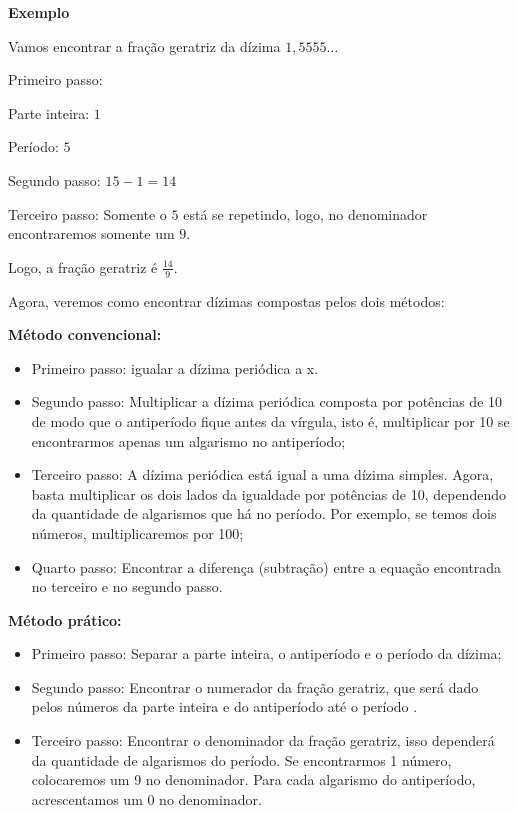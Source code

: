 \textbf{Exemplo}

Vamos encontrar a fração geratriz da dízima $1,5555\ldots{}$

Primeiro passo:

Parte inteira: $1$

Período: $5$

Segundo passo: $15 - 1 = 14$

Terceiro passo: Somente o $5$ está se repetindo, logo, no denominador
encontraremos somente um $9$.

Logo, a fração geratriz é $\frac{14}{9}$.

Agora, veremos como encontrar dízimas compostas pelos dois métodos:

\textbf{Método convencional:}

\begin{itemize}
\item
  Primeiro passo: igualar a dízima periódica a x.
\item
  Segundo passo: Multiplicar a dízima periódica composta por potências
  de 10 de modo que o antiperíodo fique antes da vírgula, isto é,
  multiplicar por 10 se encontrarmos apenas um algarismo no antiperíodo;
\item
  Terceiro passo: A dízima periódica está igual a uma dízima simples.
  Agora, basta multiplicar os dois lados da igualdade por potências de
  10, dependendo da quantidade de algarismos que há no período. Por
  exemplo, se temos dois números, multiplicaremos por 100;
\item
  Quarto passo: Encontrar a diferença (subtração) entre a equação
  encontrada no terceiro e no segundo passo.
\end{itemize}

\textbf{Método prático:}

\begin{itemize}
\item
  Primeiro passo: Separar a parte inteira, o antiperíodo e o período da
  dízima;
\item
  Segundo passo: Encontrar o numerador da fração geratriz, que será dado
  pelos números da parte inteira e do antiperíodo até o período .
\item
  Terceiro passo: Encontrar o denominador da fração geratriz, isso
  dependerá da quantidade de algarismos do período. Se encontrarmos 1
  número, colocaremos um 9 no denominador. Para cada algarismo do
  antiperíodo, acrescentamos um 0 no denominador.
\end{itemize}


